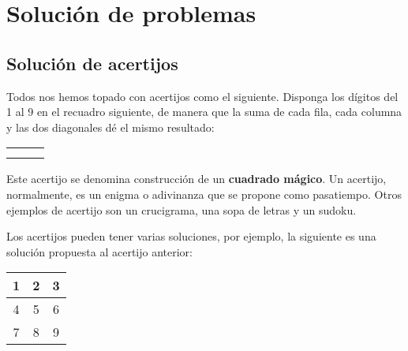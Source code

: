 
\chapter{Solución de problemas}

\section{Solución de acertijos}

Todos nos hemos topado con acertijos como el siguiente. Disponga 
los dígitos del 1 al 9 en el recuadro siguiente, de manera que la suma de cada fila, cada columna y las dos diagonales dé el mismo resultado:
\begin{center}
\begin{tabular}{|c|c|c|}
\hline 
 &  & \tabularnewline
\hline 
 &  & \tabularnewline
\hline 
 &  & \tabularnewline
\hline
\end{tabular}
\end{center}

Este acertijo  se denomina construcción de un { \bf cuadrado
mágico}. Un acertijo, normalmente, es un enigma o adivinanza que se propone como pasatiempo. Otros ejemplos de acertijo son un crucigrama, una sopa de letras y un sudoku.

Los acertijos pueden tener varias soluciones, por ejemplo, la siguiente es una solución propuesta al acertijo anterior:

\begin{center}
\begin{tabular}{|c|c|c|}
\hline 
1 & 2 & 3\tabularnewline
\hline
4 & 5 & 6\tabularnewline
\hline 
7 & 8 & 9 \tabularnewline
\hline
\end{tabular}
\end{center}

